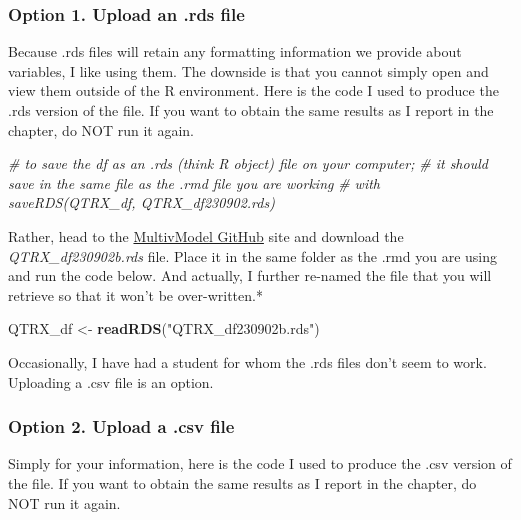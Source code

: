 \documentclass[
  11pt,
]{book}
\newenvironment{Shaded}{\begin{snugshade}}{\end{snugshade}}
\newcommand{\CommentTok}[1]{\textcolor[rgb]{0.37,0.37,0.37}{\textit{#1}}}
\newcommand{\FunctionTok}[1]{\textcolor[rgb]{0.27,0.27,0.27}{\textbf{#1}}}
\newcommand{\NormalTok}[1]{#1}
\newcommand{\OtherTok}[1]{\textcolor[rgb]{0.37,0.37,0.37}{#1}}
\newcommand{\StringTok}[1]{\textcolor[rgb]{0.5,0.5,0.5}{#1}}
\begin{document}
\hypertarget{option-1.-upload-an-.rds-file}{%
\subsubsection{Option 1. Upload an .rds file}\label{option-1.-upload-an-.rds-file}}

Because .rds files will retain any formatting information we provide about variables, I like using them. The downside is that you cannot simply open and view them outside of the R environment. Here is the code I used to produce the .rds version of the file. If you want to obtain the same results as I report in the chapter, do NOT run it again.

\begin{Shaded}
\begin{Highlighting}[]
\CommentTok{\# to save the df as an .rds (think \textquotesingle{}R object\textquotesingle{}) file on your computer;}
\CommentTok{\# it should save in the same file as the .rmd file you are working}
\CommentTok{\# with saveRDS(QTRX\_df, \textquotesingle{}QTRX\_df230902.rds\textquotesingle{})}
\end{Highlighting}
\end{Shaded}

Rather, head to the \href{https://github.com/lhbikos/ReC_MultivModel}{MultivModel GitHub} site and download the \emph{QTRX\_df230902b.rds} file. Place it in the same folder as the .rmd you are using and run the code below. And actually, I further re-named the file that you will retrieve so that it won't be over-written.*

\begin{Shaded}
\begin{Highlighting}[]
\NormalTok{QTRX\_df }\OtherTok{\textless{}{-}} \FunctionTok{readRDS}\NormalTok{(}\StringTok{"QTRX\_df230902b.rds"}\NormalTok{)}
\end{Highlighting}
\end{Shaded}

Occasionally, I have had a student for whom the .rds files don't seem to work. Uploading a .csv file is an option.

\hypertarget{option-2.-upload-a-.csv-file}{%
\subsubsection{Option 2. Upload a .csv file}\label{option-2.-upload-a-.csv-file}}

Simply for your information, here is the code I used to produce the .csv version of the file. If you want to obtain the same results as I report in the chapter, do NOT run it again.
\end{document}
